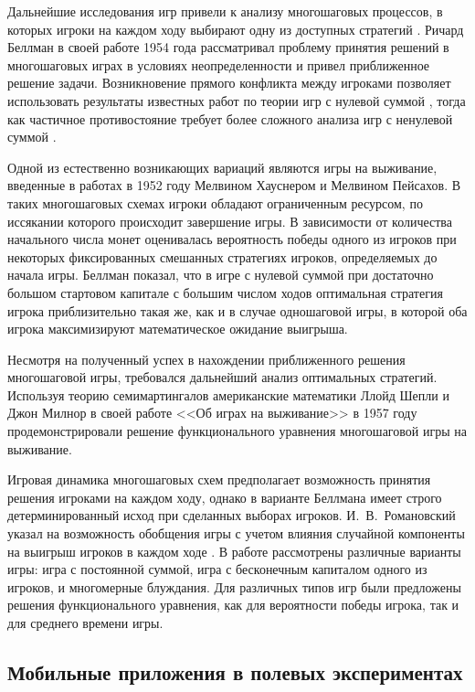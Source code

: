 Дальнейшие исследования игр привели к анализу многошаговых процессов, в которых игроки на каждом ходу выбирают одну из доступных стратегий \cite{bellman_decision_1954}. Ричард Беллман в своей работе 1954 года рассматривал проблему принятия решений в многошаговых играх в условиях неопределенности \cite{bellman_decision-making_1954} и привел приближенное решение задачи. Возникновение прямого конфликта между игроками позволяет использовать результаты известных работ по теории игр с нулевой суммой \cite{nash_non-cooperative_1951}, тогда как частичное противостояние требует более сложного анализа игр с ненулевой суммой \cite{bellman_non-zero_1949}. 

Одной из естественно возникающих вариаций являются игры на выживание, введенные в работах \cite{hausner_games_1952,peisakoff_more_1952} в 1952 году Мелвином Хауснером и Мелвином Пейсахов. В таких многошаговых схемах игроки обладают ограниченным ресурсом, по иссякании которого происходит завершение игры. В зависимости от количества начального числа монет оценивалась вероятность победы одного из игроков при некоторых фиксированных смешанных стратегиях игроков, определяемых до начала игры. Беллман показал, что в игре с нулевой суммой при достаточно большом стартовом капитале с большим числом ходов оптимальная стратегия игрока приблизительно такая же, как и в случае одношаговой игры, в которой оба игрока максимизируют математическое ожидание выигрыша. 

Несмотря на полученный успех в нахождении приближенного решения многошаговой игры, требовался дальнейший анализ оптимальных стратегий. Используя теорию семимартингалов американские математики Ллойд Шепли и Джон Милнор в своей работе <<Об играх на выживание>> в 1957 году \cite{milnor_games_1956} продемонстрировали решение функционального уравнения многошаговой игры на выживание. 

Игровая динамика многошаговых схем предполагает возможность принятия решения игроками на каждом ходу, однако в варианте Беллмана имеет строго детерминированный исход при сделанных выборах игроков. И.~В.~Романовский указал на возможность обобщения игры с учетом влияния случайной компоненты на выигрыш игроков в каждом ходе \cite{romanovsky_1961}. В работе рассмотрены различные варианты игры: игра с постоянной суммой, игра с бесконечным капиталом одного из игроков, и многомерные блуждания. Для различных типов игр были предложены решения функционального уравнения, как для вероятности победы игрока, так и для среднего времени игры.

\subsection{Мобильные приложения в полевых экспериментах}\label{subsec:ch1/sec3/sub3}

